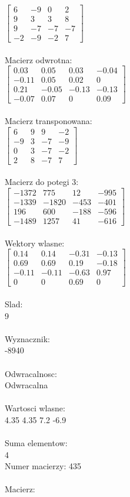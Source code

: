 \documentclass[a4paper,12pt]{article}
\begin{document}
$\begin{bmatrix} 6&-9&0&2\\9&3&3&8\\9&-7&-7&-7\\-2&-9&-2&7 \end{bmatrix}$
\\
\\
Macierz odwrotna:\\

$\begin{bmatrix} 0.03&0.05&0.03&-0.04\\-0.11&0.05&0.02&0\\0.21&-0.05&-0.13&-0.13\\-0.07&0.07&0&0.09 \end{bmatrix}$
\\
\\
Macierz transponowana:\\

$\begin{bmatrix} 6&9&9&-2\\-9&3&-7&-9\\0&3&-7&-2\\2&8&-7&7 \end{bmatrix}$
\\
\\
Macierz do potegi 3:\\

$\begin{bmatrix} -1372&775&12&-995\\-1339&-1820&-453&-401\\196&600&-188&-596\\-1489&1257&41&-616 \end{bmatrix}$
\\
\\
Wektory wlasne:\\

$\begin{bmatrix} 0.14&0.14&-0.31&-0.13\\0.69&0.69&0.19&-0.18\\-0.11&-0.11&-0.63&0.97\\0&0&0.69&0 \end{bmatrix}$
\\
\\
Slad:\\
9
\\
\\
Wyznacznik:\\
-8940
\\
\\
Odwracalnosc:\\
Odwracalna
\\
\\
Wartosci wlasne:\\
4.35 4.35 7.2 -6.9
\\
\\
Suma elementow:\\
4
\\
\newpage
Numer macierzy:
435
\\
\\
Macierz:\\
\end{document}
